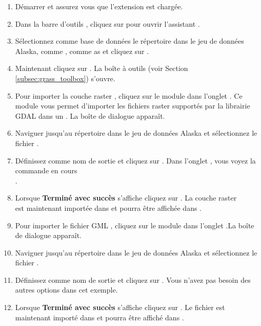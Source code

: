 \begin{enumerate}
  \item Démarrer \qg et assurez vous que l'extension \grass est chargée.
  \item Dans la barre d'outils \grass, cliquez sur  pour ouvrir l'assistant .
  \item Sélectionnez comme base de données \grass le répertoire  dans le jeu de données \qg Alaska, comme , comme as   et cliquez sur .
  \item Maintenant cliquez sur . La boîte à outils \grass (voir Section \ref{subsec:grass_toolbox}) s'ouvre.
  \item  Pour importer la couche raster , cliquez sur le module  dans l'onglet . Ce module \grass vous permet d'importer les fichiers raster supportés par la librairie GDAL dans un  \grass. La boîte de dialogue   apparaît.
  \item Naviguer jusqu'au répertoire  dans le jeu de données \qg Alaska et sélectionnez le fichier .
  \item Définissez  comme nom de sortie et cliquez sur . Dans l'onglet , vous voyez la commande \grass en cours\\ .
  \item Lorsque \textbf{Terminé avec succès} s'affiche cliquez sur . La couche raster\\  est maintenant importée dans \grass et pourra être affichée dans \qg.
  \item Pour importer le fichier GML , cliquez sur le module  dans l'onglet .La boîte de dialogue   apparaît.
  \item Naviguer jusqu'au répertoire  dans le jeu de données \qg Alaska et sélectionnez le fichier .
  \item Définissez  comme nom de sortie et cliquez sur . Vous n'avez pas besoin des autres options dans cet exemple.
  \item Lorsque \textbf{Terminé avec succès} s'affiche cliquez sur . Le fichier  est maintenant importé dans \grass et pourra être affiché dans \qg.
\end{enumerate}


